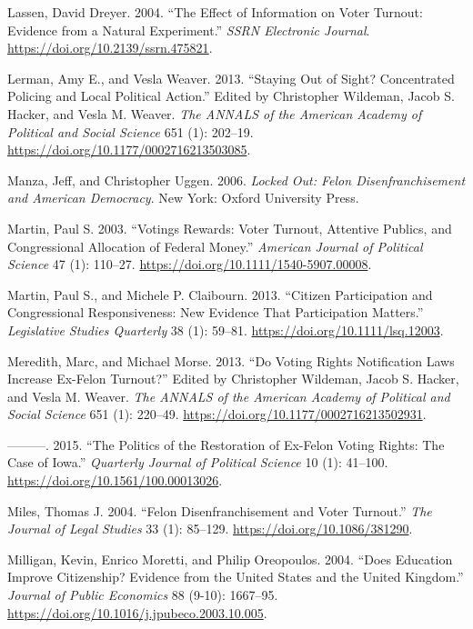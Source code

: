 \documentclass[12pt,]{article}
\begin{document}
\leavevmode\hypertarget{ref-Lassen2004}{}%
Lassen, David Dreyer. 2004. ``The Effect of Information on Voter Turnout: Evidence from a Natural Experiment.'' \emph{SSRN Electronic Journal}. \url{https://doi.org/10.2139/ssrn.475821}.

\leavevmode\hypertarget{ref-Lerman2013}{}%
Lerman, Amy E., and Vesla Weaver. 2013. ``Staying Out of Sight? Concentrated Policing and Local Political Action.'' Edited by Christopher Wildeman, Jacob S. Hacker, and Vesla M. Weaver. \emph{The ANNALS of the American Academy of Political and Social Science} 651 (1): 202--19. \url{https://doi.org/10.1177/0002716213503085}.

\leavevmode\hypertarget{ref-locked_out}{}%
Manza, Jeff, and Christopher Uggen. 2006. \emph{Locked Out: Felon Disenfranchisement and American Democracy}. New York: Oxford University Press.

\leavevmode\hypertarget{ref-Martin2003}{}%
Martin, Paul S. 2003. ``Votings Rewards: Voter Turnout, Attentive Publics, and Congressional Allocation of Federal Money.'' \emph{American Journal of Political Science} 47 (1): 110--27. \url{https://doi.org/10.1111/1540-5907.00008}.

\leavevmode\hypertarget{ref-Martin2013}{}%
Martin, Paul S., and Michele P. Claibourn. 2013. ``Citizen Participation and Congressional Responsiveness: New Evidence That Participation Matters.'' \emph{Legislative Studies Quarterly} 38 (1): 59--81. \url{https://doi.org/10.1111/lsq.12003}.

\leavevmode\hypertarget{ref-Meredith2013}{}%
Meredith, Marc, and Michael Morse. 2013. ``Do Voting Rights Notification Laws Increase Ex-Felon Turnout?'' Edited by Christopher Wildeman, Jacob S. Hacker, and Vesla M. Weaver. \emph{The ANNALS of the American Academy of Political and Social Science} 651 (1): 220--49. \url{https://doi.org/10.1177/0002716213502931}.

\leavevmode\hypertarget{ref-Meredith2015}{}%
---------. 2015. ``The Politics of the Restoration of Ex-Felon Voting Rights: The Case of Iowa.'' \emph{Quarterly Journal of Political Science} 10 (1): 41--100. \url{https://doi.org/10.1561/100.00013026}.

\leavevmode\hypertarget{ref-Miles2004}{}%
Miles, Thomas J. 2004. ``Felon Disenfranchisement and Voter Turnout.'' \emph{The Journal of Legal Studies} 33 (1): 85--129. \url{https://doi.org/10.1086/381290}.

\leavevmode\hypertarget{ref-Milligan2004}{}%
Milligan, Kevin, Enrico Moretti, and Philip Oreopoulos. 2004. ``Does Education Improve Citizenship? Evidence from the United States and the United Kingdom.'' \emph{Journal of Public Economics} 88 (9-10): 1667--95. \url{https://doi.org/10.1016/j.jpubeco.2003.10.005}.
\end{document}
